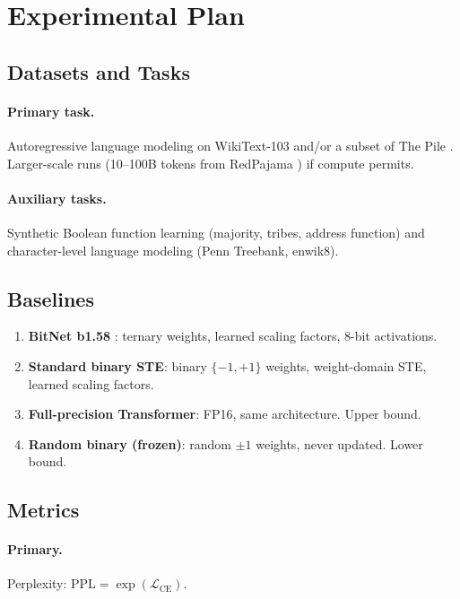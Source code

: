 \documentclass[12pt,a4paper]{article}
\theoremstyle{plain}
\theoremstyle{definition}
\theoremstyle{remark}
\newcommand{\pmone}{\{-1,+1\}}
\begin{document}
\section{Experimental Plan}\label{sec:experiments}

\subsection{Datasets and Tasks}\label{sec:datasets}

\paragraph{Primary task.}
Autoregressive language modeling on WikiText-103 \citep{merity2017wikitext} and/or a subset of The Pile \citep{gao2021pile}. Larger-scale runs (10--100B tokens from RedPajama \citep{redpajama2023}) if compute permits.

\paragraph{Auxiliary tasks.}
Synthetic Boolean function learning (majority, tribes, address function) and character-level language modeling (Penn Treebank, enwik8).

\subsection{Baselines}\label{sec:baselines}

\begin{enumerate}
    \item \textbf{BitNet b1.58} \citep{ma2024era}: ternary weights, learned scaling factors, 8-bit activations.
    \item \textbf{Standard binary STE}: binary $\pmone$ weights, weight-domain STE, learned scaling factors.
    \item \textbf{Full-precision Transformer}: FP16, same architecture. Upper bound.
    \item \textbf{Random binary (frozen)}: random $\pm 1$ weights, never updated. Lower bound.
\end{enumerate}

\subsection{Metrics}\label{sec:metrics}

\paragraph{Primary.} Perplexity: $\text{PPL} = \exp(\mathcal{L}_{\text{CE}})$.
\end{document}
